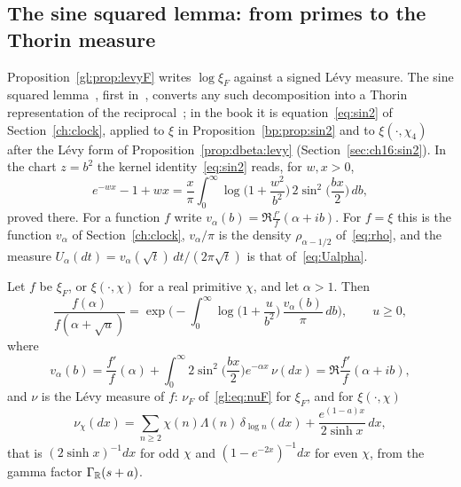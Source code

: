 \subsection{The sine squared lemma: from primes to the Thorin measure}\label{gl:sec:sinsq}

Proposition~\ref{gl:prop:levyF} writes $\log\xi_F$ against a signed L\'evy measure. The sine squared lemma~\cite[Lemma~8.1]{P17}, first in~\cite[Lemma~1]{P17v5}, converts any such decomposition into a Thorin representation of the reciprocal~\cite[Theorem~8.2]{P17}; in the book it is equation~\eqref{eq:sin2} of Section~\ref{ch:clock}, applied to $\xi$ in Proposition~\ref{bp:prop:sin2} and to $\xi(\cdot,\chi_4)$ after the L\'evy form of Proposition~\ref{prop:dbeta:levy} (Section~\ref{sec:ch16:sin2}). In the chart $z=b^2$ the kernel identity~\eqref{eq:sin2} reads, for $w,x>0$,
\begin{equation}\label{gl:eq:sinsq}
e^{-wx}-1+wx=\frac x\pi\int_0^\infty\log\Big(1+\frac{w^2}{b^2}\Big)\,2\sin^2\Big(\frac{bx}2\Big)\,db ,
\end{equation}
proved there. For a function $f$ write $v_\alpha(b)=\Re\frac{f'}{f}(\alpha+ib)$. For $f=\xi$ this is the function $v_\alpha$ of Section~\ref{ch:clock}, $v_\alpha/\pi$ is the density $\rho_{\alpha-1/2}$ of~\eqref{eq:rho}, and the measure $U_\alpha(dt)=v_\alpha(\sqrt t)\,dt/(2\pi\sqrt t)$ is that of~\eqref{eq:Ualpha}.

\begin{proposition}\label{gl:prop:sinsq}
Let $f$ be $\xi_F$, or $\xi(\cdot,\chi)$ for a real primitive $\chi$, and let $\alpha>1$. Then
\begin{equation}\label{gl:eq:sinsq-thorin}
\frac{f(\alpha)}{f(\alpha+\sqrt u)}=\exp\Big(-\int_0^\infty\log\Big(1+\frac u{b^2}\Big)\,\frac{v_\alpha(b)}\pi\,db\Big),\qquad u\ge0,
\end{equation}
where
\begin{equation}\label{gl:eq:Malpha}
v_\alpha(b)=\frac{f'}{f}(\alpha)+\int_0^\infty2\sin^2\Big(\frac{bx}2\Big)e^{-\alpha x}\,\nu(dx)=\Re\frac{f'}{f}(\alpha+ib),
\end{equation}
and $\nu$ is the L\'evy measure of $f$: $\nu_F$ of~\eqref{gl:eq:nuF} for $\xi_F$, and for $\xi(\cdot,\chi)$
\[
\nu_\chi(dx)=\sum_{n\ge2}\chi(n)\Lambda(n)\,\delta_{\log n}(dx)+\frac{e^{(1-a)x}}{2\sinh x}\,dx,
\]
that is $(2\sinh x)^{-1}dx$ for odd $\chi$ and $(1-e^{-2x})^{-1}dx$ for even $\chi$, from the gamma factor $\Gamma_{\mathbb{R}}(s+a)$.
\end{proposition}

